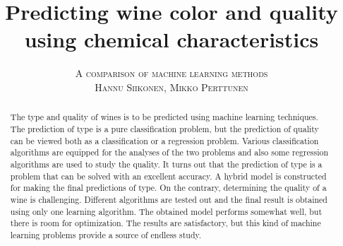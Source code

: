\documentclass[twoside]{article}
\title{\vspace{-15mm}\fontsize{24pt}{10pt}\selectfont\textbf{Predicting wine color and quality using chemical characteristics}}
\author{
\large
\textsc{A comparison of machine learning methods}\\[2mm]
\textsc{Hannu Siikonen, Mikko Perttunen}\\[2mm]
\vspace{-5mm}
}
\date{}
\begin{document}
\maketitle %


\begin{abstract}
The type and quality of wines is to be predicted using machine learning techniques. The prediction
of type is a pure classification problem, but the prediction of quality can be viewed both as
a classification or a regression problem. Various classification algorithms are equipped
for the analyses of the two problems and also some regression algorithms are used to study
the quality. It turns out that the prediction of type is a problem that can be solved
with an excellent accuracy. A hybrid model is constructed for making the final predictions
of type. On the contrary, determining the quality of a wine is challenging. Different
algorithms are tested out and the final result is obtained using only one learning
algorithm. The obtained model performs somewhat well, but there is room for optimization. 
The results are satisfactory, but this kind of machine learning problems provide a source
of endless study.

\end{abstract}

\end{document}
